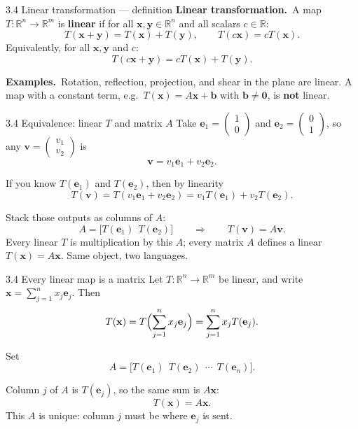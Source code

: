 \documentclass[11pt,aspectratio=169]{beamer}
\begin{document}
\begin{frame}{3.4 Linear transformation --- definition}
  \footnotesize
  \textbf{Linear transformation.}\
  A map $T:\mathbb{R}^n\to\mathbb{R}^m$ is \textbf{linear} if for all $\mathbf{x},\mathbf{y}\in\mathbb{R}^n$
  and all scalars $c\in\mathbb{R}$:
  \[
    T(\mathbf{x}+\mathbf{y})=T(\mathbf{x})+T(\mathbf{y}),
    \qquad
    T(c\mathbf{x})=cT(\mathbf{x}).
  \]
  Equivalently, for all $\mathbf{x},\mathbf{y}$ and $c$:
  \[
    T(c\mathbf{x}+\mathbf{y})=cT(\mathbf{x})+T(\mathbf{y}).
  \]

  \medskip
  \textbf{Examples.}\
  Rotation, reflection, projection, and shear in the plane are linear.
  A map with a constant term, e.g.\ $T(\mathbf{x})=A\mathbf{x}+\mathbf{b}$ with $\mathbf{b}\neq\mathbf{0}$,
  is \textbf{not} linear.
\end{frame}

\begin{frame}{3.4 Equivalence: linear $T$ and matrix $A$}
  \footnotesize
  Take $\mathbf{e}_1=\begin{pmatrix}1\\ 0\end{pmatrix}$ and
  $\mathbf{e}_2=\begin{pmatrix}0\\ 1\end{pmatrix}$, so any
  $\mathbf{v}=\begin{pmatrix}v_1\\ v_2\end{pmatrix}$ is
  \[
    \mathbf{v}=v_1\mathbf{e}_1+v_2\mathbf{e}_2.
  \]

  \medskip
  If you know $T(\mathbf{e}_1)$ and $T(\mathbf{e}_2)$, then by linearity
  \[
    T(\mathbf{v})
    =T(v_1\mathbf{e}_1+v_2\mathbf{e}_2)
    =v_1 T(\mathbf{e}_1)+v_2 T(\mathbf{e}_2).
  \]

  \medskip
  Stack those outputs as columns of $A$:
  \[
    A=\bigl[T(\mathbf{e}_1)\ \ T(\mathbf{e}_2)\bigr]
    \qquad\Longrightarrow\qquad
    T(\mathbf{v})=A\mathbf{v}.
  \]
  Every linear $T$ is multiplication by this $A$; every matrix $A$ defines a linear
  $T(\mathbf{x})=A\mathbf{x}$. Same object, two languages.
\end{frame}

\begin{frame}{3.4 Every linear map is a matrix}
  \footnotesize
  Let $T:\mathbb{R}^n\to\mathbb{R}^m$ be linear, and write
  $\mathbf{x}=\sum_{j=1}^n x_j\mathbf{e}_j$. Then
  \[
    T(\mathbf{x})
    =T\Bigl(\sum_{j=1}^n x_j\mathbf{e}_j\Bigr)
    =\sum_{j=1}^n x_j T(\mathbf{e}_j).
  \]

  \medskip
  Set
  \[
    A=\bigl[T(\mathbf{e}_1)\ \ T(\mathbf{e}_2)\ \ \cdots\ \ T(\mathbf{e}_n)\bigr].
  \]

  \medskip
  Column $j$ of $A$ is $T(\mathbf{e}_j)$, so the same sum is $A\mathbf{x}$:
  \[
    T(\mathbf{x})=A\mathbf{x}.
  \]
  This $A$ is unique: column $j$ must be where $\mathbf{e}_j$ is sent.
\end{frame}
\end{document}
